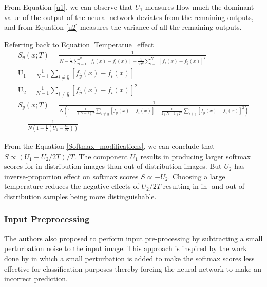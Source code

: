     From Equation \ref{u1}, we can observe that $U_{1}$ measures How much the dominant value of the output of the neural network deviates from the remaining outputs, and from Equation \ref{u2} measures the variance of all the remaining outputs.
    
    Referring back to Equation \ref{Temperatue_effect}
    \begin{equation}
        \begin{gathered}
            S_{y}(x ; T)=\frac{1}{N-\frac{1}{T} \sum_{i-1}^{N}\left[f_{i}(x)-f_{i}(x)\right]+\frac{1}{2 T^{2}} \sum_{i-1}^{N}\left[f_{i}(x)-f_{\hat{y}}(x)\right]^{2}} \\[7.5pt]
            \mathrm{U}_{1}=\frac{1}{N-1} \sum_{i \neq \hat{y}}\left[f_{\hat{y}}(x)-f_{i}(x)\right] \\[7.5pt]
            \mathrm{U}_{2}=\frac{1}{N-1} \sum_{i \neq \hat{y}}\left[f_{\hat{y}}(x)-f_{i}(x)\right]^{2} \\[7.5pt]
            S_{y}(x ; T)=\frac{1}{N\left(1-\frac{1}{(N-1) T} \sum_{i \neq \hat{y}}\left[f_{\hat{y}}(x)-f_{i}(x)\right]+\frac{1}{2(N-1) T^{2}} \sum_{i+\hat{y}}\left[f_{\hat{y}}(x)-f_{i}(x)\right]^{2}\right)} \\[7.5pt]
            =\frac{1}{N\left(1-\frac{1}{T}\left(U_{1}-\frac{U_{2}}{2 T}\right)\right)}
        \end{gathered}
        \label{Softmax_modifications}
    \end{equation}
        
    From the Equation \ref{Softmax_modifications}, we can conclude that $S \propto\left(U_{1}-U_{2} / 2 T\right) / T$. The component $U_{1}$ results in producing larger softmax scores for in-distribution images than out-of-distribution images. But $U_{2}$ has inverse-proportion effect on softmax scores $S \propto-U_{2}$. 
    Choosing a large temperature reduces the negative effects of $U_{2} / 2 T$ resulting in in- and out-of-distribution samples being more distinguishable.
    
    \subsubsection{Input Preprocessing}
    The authors also proposed to perform input pre-processing by subtracting a small perturbation noise to the input image. This approach is inspired by the work done by \citet{Goodfellow2015} in which a small perturbation is added to make the softmax scores less effective for classification purposes thereby forcing the neural network to make an incorrect prediction. 
    
